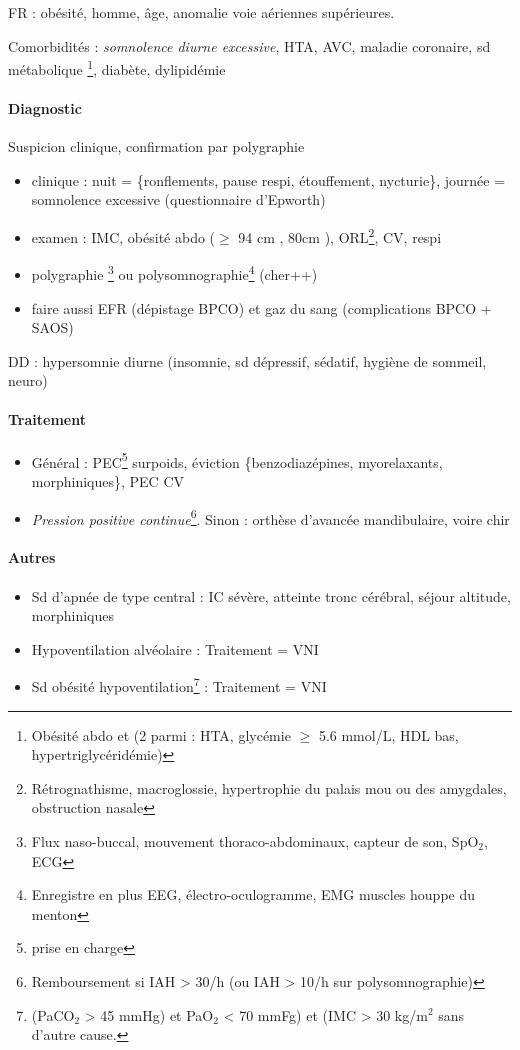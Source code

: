 \documentclass{book}
\begin{document}
FR : obésité, homme, âge, anomalie voie aériennes supérieures. 

Comorbidités : \emph{somnolence diurne excessive}, HTA, AVC, maladie coronaire, sd
métabolique \footnote{Obésité abdo et (2 parmi : HTA, glycémie \(\ge\) 5.6 mmol/L, HDL bas, hypertriglycéridémie)}, diabète, dylipidémie
\paragraph{Diagnostic}
\label{sec:org0fe65ff}
Suspicion clinique, confirmation par polygraphie 
\begin{itemize}
\item clinique : nuit = \{ronflements, pause respi, étouffement, nycturie\}, journée =
somnolence excessive (questionnaire d'Epworth)
\item examen : IMC, obésité abdo (\(\ge\) 94 cm \male, 80cm \female), ORL\footnote{Rétrognathisme, macroglossie, hypertrophie du palais mou ou des
amygdales, obstruction nasale}, CV, respi
\item polygraphie \footnote{Flux naso-buccal, mouvement thoraco-abdominaux, capteur de son, SpO\(_{\text{2}}\), ECG} ou polysomnographie\footnote{Enregistre en plus EEG, électro-oculogramme, EMG muscles houppe du menton} (cher++)
\item faire aussi EFR (dépistage BPCO) et gaz du sang (complications BPCO + SAOS)
\end{itemize}
DD : hypersomnie diurne (insomnie, sd dépressif, sédatif, hygiène de sommeil, neuro)
\paragraph{Traitement}
\label{sec:org09b7330}
\begin{itemize}
\item Général : PEC\footnote{prise en charge} surpoids, éviction \{benzodiazépines, myorelaxants, morphiniques\}, PEC CV
\item \emph{Pression positive continue}\footnote{Remboursement si IAH > 30/h (ou IAH > 10/h sur polysomnographie)}. Sinon : orthèse d'avancée mandibulaire, voire chir
\end{itemize}

\paragraph{Autres}
\label{sec:orgb70ef26}
\begin{itemize}
\item Sd d'apnée de type central : IC sévère, atteinte tronc cérébral, séjour altitude, morphiniques
\item Hypoventilation alvéolaire : Traitement = VNI
\item Sd obésité hypoventilation\footnote{(PaCO\(_{\text{2}}\) > 45 mmHg) et PaO\(_{\text{2}}\) < 70 mmFg) et (IMC > 30 kg/m\(^{\text{2}}\) sans d'autre cause.} : Traitement = VNI
\end{itemize}
\end{document}
